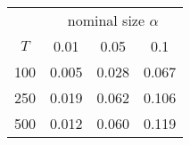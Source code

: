 % 
\begin{tabular}{cccc}
  \hline
  & \multicolumn{3}{c}{nominal size $\alpha$} \\
 $T$ & 0.01 & 0.05 & 0.1 \\
 \hline
100 & 0.005 & 0.028 & 0.067 \\ 
  250 & 0.019 & 0.062 & 0.106 \\ 
  500 & 0.012 & 0.060 & 0.119 \\ 
   \hline
\end{tabular}
